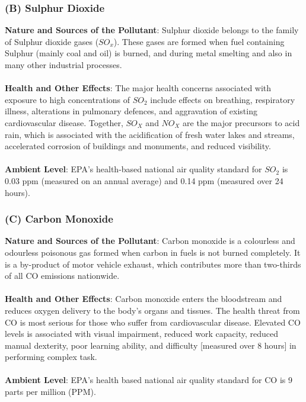 \subsubsection{(B) Sulphur Dioxide}
\textbf{Nature and Sources of the Pollutant}: Sulphur dioxide belongs to the family of Sulphur dioxide gases ($SO_x$). These gases are formed when fuel containing Sulphur (mainly coal and oil) is burned, and during metal smelting and also in many other industrial processes.
\\
\\
\textbf{Health and Other Effects}: The major health concerns associated with exposure to high concentrations of $SO_2$ include effects on breathing, respiratory illness, alterations in pulmonary defences, and aggravation of existing cardiovascular disease. Together, $SO_X$ and $NO_X$ are the major precursors to acid rain, which is associated with the acidification of fresh water lakes and streams, accelerated corrosion of buildings and monuments, and reduced visibility. 
\\
\\
\textbf{Ambient Level}: EPA's health-based national air quality standard for $SO_2$ is 0.03 ppm (measured on an annual average) and 0.14 ppm (measured over 24 hours).

\subsubsection{(C) Carbon Monoxide}
\textbf{Nature and Sources of the Pollutant}: Carbon monoxide is a colourless and odourless poisonous gas formed when carbon in fuels is not burned completely. It is a by-product of motor vehicle exhaust, which contributes more than two-thirds of all CO emissions nationwide.
\\
\\
\textbf{Health and Other Effects}: Carbon monoxide enters the bloodstream and reduces oxygen delivery to the body's organs and tissues. The health threat from CO is most serious for those who suffer from cardiovascular disease. Elevated CO levels is associated with visual impairment, reduced work capacity, reduced manual dexterity, poor learning ability, and difficulty [measured over 8 hours] in performing complex task.
\\
\\
\textbf{Ambient Level}: EPA's health based national air quality standard for CO is 9 parts per million (PPM).

